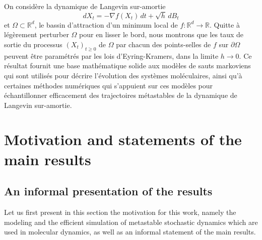 \documentclass[JEP,XML,SOM,Unicode,NoEqCountersInSection,NoFloatCountersInSection,published]{cedram}
\theoremstyle{plain}
\theoremstyle{definition}
\begin{document}




\begin{altabstract}
On considère la dynamique de Langevin sur-amortie
\[
dX_t = -\nabla f(X_t) \, dt + \sqrt{h} \, dB_t
\]
et $\Omega \subset \mathbb{R}^d$, le bassin d’attraction d’un minimum local de $f: \mathbb{R}^d \to \mathbb{R}$. Quitte à légèrement perturber $\Omega$ pour en lisser le bord, nous montrons que les taux de sortie du processus $(X_t)_{t \ge 0}$ de $\Omega$ par chacun des points-selles de $f$ sur $\partial \Omega$ peuvent être paramétrés par les lois d’Eyring-Kramers, dans la limite $h \to 0$. Ce résultat fournit une base mathématique solide aux modèles de sauts markoviens qui sont utilisés pour décrire l’évolution des systèmes moléculaires, ainsi qu’à certaines méthodes numériques qui s’appuient sur ces modèles pour échantillonner efficacement des trajectoires métastables de la dynamique de Langevin sur-amortie.
\end{altabstract}

\maketitle
\vspace*{-\baselineskip}
\tableofcontents


\section{Motivation and statements of the main results}\label{sec:intro}

\subsection{An informal presentation of the results}\label{sec:informal}

Let us first present in this section the motivation for this work,
namely the modeling and the efficient simulation of metastable
stochastic dynamics which are used in molecular dynamics, as well as
an informal statement of the main results.
\end{document}
